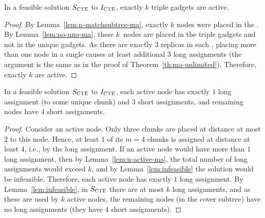 \begin{lemma}
  In a feasible solution $S_{\mathrm{\textsc{CTE}}}$ to $I_{\mathrm{\textsc{CTE}}}$, exactly $k$ triple gadgets are active.
  \label{lem:n-active-ma}
\end{lemma}
\begin{proof}
  By Lemma~\ref{lem:n-matchsubtree-ma}, exactly $k$ nodes were placed in the \MatchSubtree{}.
  By Lemma~\ref{lem:no-unq-ma}, these $k$~nodes are placed in the triple gadgets and not in the unique gadgets.
As there are exactly $3$ replicas in each \TripleGadget{}, placing more than one node in a single \TripleGadget{} causes at least additional $3$ long assignments (the argument is the same as in the proof of Theorem~\ref{th:ma-unlimited}).
Therefore, exactly $k$ \TripleGadgets{} are active.
\end{proof}

\begin{lemma}
  In a feasible solution $S_{\mathrm{\textsc{CTE}}}$ to $I_{\mathrm{\textsc{CTE}}}$, each active node has exactly $1$ long assignment (to some unique chunk) and $3$ short assignments, and remaining nodes have $4$ short assignments.
  \label{lem:assignment-length}
\end{lemma}
\begin{proof}
  Consider an active node. Only three chunks are placed at distance at most $2$ to this node. Hence, at least $1$ of its $m = 4$ chunks is assigned at distance at least $4$, i.e., by the long assignment.
  If an active node would have more than $1$ long assignment, then by Lemma~\ref{lem:n-active-ma}, the total number of long assignments would exceed $k$, and by Lemma~\ref{lem:infeasible} the solution would be infeasible.
  Therefore, each active node has exactly $1$ long assignment.
  By Lemma~\ref{lem:infeasible}, in $S_{\mathrm{\textsc{CTE}}}$ there are at most $k$ long assignments, and as these are used by $k$ active nodes, the remaining nodes (in the cover subtree) have no long assignments (they have $4$ short assignments).
\end{proof}

